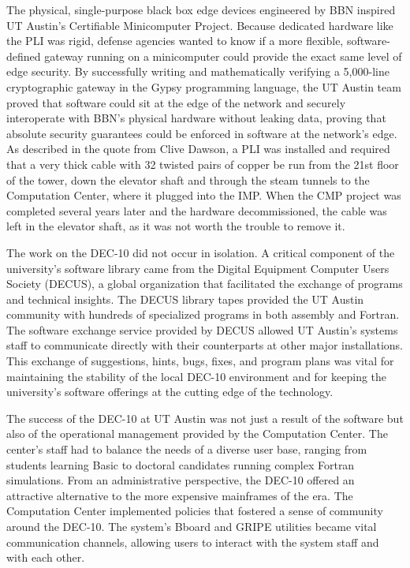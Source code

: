 The physical, single-purpose black box edge devices engineered by BBN inspired UT Austin's Certifiable Minicomputer Project. Because dedicated hardware like the PLI was rigid, defense agencies wanted to know if a more flexible, software-defined gateway running on a minicomputer could provide the exact same level of edge security. By successfully writing and mathematically verifying a 5,000-line cryptographic gateway in the Gypsy programming language, the UT Austin team proved that software could sit at the edge of the network and securely interoperate with BBN's physical hardware without leaking data, proving that absolute security guarantees could be enforced in software at the network's edge. As described in the quote from Clive Dawson, a PLI was installed and required that a very thick cable with 32 twisted pairs of copper be run from the 21st floor of the tower, down the elevator shaft and through the steam tunnels to the Computation Center, where it plugged into the IMP. When the CMP project was completed several years later and the hardware decommissioned, the cable was left in the elevator shaft, as it was not worth the trouble to remove it.

The work on the DEC-10 did not occur in isolation. A critical component of the university's software library came from the Digital Equipment Computer Users Society (DECUS), a global organization that facilitated the exchange of programs and technical insights. The DECUS library tapes provided the UT Austin community with hundreds of specialized programs in both assembly and Fortran. The software exchange service provided by DECUS allowed UT Austin's systems staff to communicate directly with their counterparts at other major installations. This exchange of suggestions, hints, bugs, fixes, and program plans was vital for maintaining the stability of the local DEC-10 environment and for keeping the university's software offerings at the cutting edge of the technology.

The success of the DEC-10 at UT Austin was not just a result of the software but also of the operational management provided by the Computation Center. The center’s staff had to balance the needs of a diverse user base, ranging from students learning Basic to doctoral candidates running complex Fortran simulations. From an administrative perspective, the DEC-10 offered an attractive alternative to the more expensive mainframes of the era. The Computation Center implemented policies that fostered a sense of community around the DEC-10. The system's Bboard and GRIPE utilities became vital communication channels, allowing users to interact with the system staff and with each other. 

